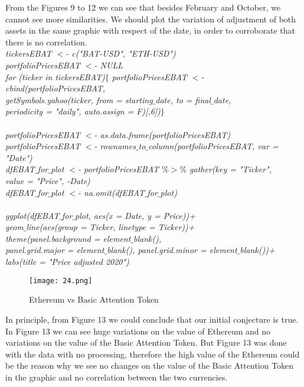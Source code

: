 \documentclass[14pt]{amsart}
\begin{document}
From the Figures 9 to 12 we can see that besides February and October, we cannot see more similarities. We should plot the variation of adjustment of both assets in the same graphic with respect of the date, in order to corroborate that there is no correlation.\\

\noindent \textit{tickersEBAT $<$- c("BAT-USD", "ETH-USD")}\\
\noindent \textit{portfolioPricesEBAT $<$- NULL}\\
\noindent \textit{for (ticker in tickersEBAT)$\{$  portfolioPricesEBAT $<$- cbind(portfolioPricesEBAT, }\\
\indent\textit{getSymbols.yahoo(ticker, from = starting$\_$date, to = final$\_$date, }\\
\indent\textit{periodicity = "daily", auto.assign = F)[,6])$\}$}\\ \\

\noindent \textit{portfolioPricesEBAT $<$- as.data.frame(portfolioPricesEBAT)}\\
\noindent \textit{portfolioPricesEBAT $<$- rownames$\_$to$\_$column(portfolioPricesEBAT, var = "Date")}\\
\noindent \textit{dfEBAT$\_$for$\_$plot $<$- portfolioPricesEBAT $\%>\%$ gather(key = "Ticker", }\\
\indent\textit{value = "Price", -Date)}\\
\noindent \textit{dfEBAT$\_$for$\_$plot $<$- na.omit(dfEBAT$\_$for$\_$plot)}\\ \\

\noindent \textit{ggplot(dfEBAT$\_$for$\_$plot, aes(x = Date, y = Price))+}\\
\indent \textit{geom$\_$line(aes(group = Ticker, linetype = Ticker))+}\\
\indent \textit{theme(panel.background =  element$\_$blank(), }\\
\indent \textit{panel.grid.major = element$\_$blank(), panel.grid.minor = element$\_$blank())+}\\
\indent \textit{labs(title = "Price adjusted 2020")}\\

\begin{figure}[h!]
  \texttt{[image: 24.png]}
  \caption{Ethereum vs Basic Attention Token}
  \label{fig:boat1}
\end{figure}

In principle, from Figure 13 we could conclude that our initial conjecture is true. In Figure 13 we can see huge variations on the value of Ethereum and no variations on the value of the Basic Attention Token. But Figure 13 was done with the data with no processing, therefore the high value of the Ethereum could be the reason why we see no changes on the value of the Basic Attention Token in the graphic and no correlation between the two currencies.
\end{document}
